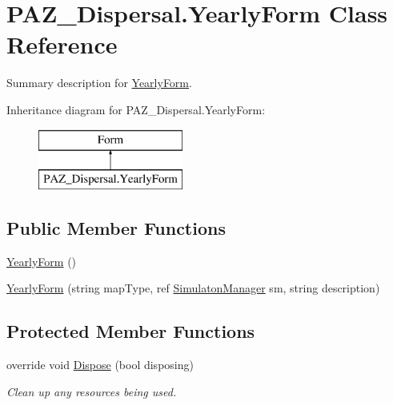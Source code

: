\hypertarget{class_p_a_z___dispersal_1_1_yearly_form}{\section{P\-A\-Z\-\_\-\-Dispersal.\-Yearly\-Form Class Reference}
\label{class_p_a_z___dispersal_1_1_yearly_form}
}


Summary description for \hyperlink{class_p_a_z___dispersal_1_1_yearly_form}{Yearly\-Form}.  


Inheritance diagram for P\-A\-Z\-\_\-\-Dispersal.\-Yearly\-Form\-:\begin{figure}[H]
\begin{center}
\leavevmode
\includegraphics[height=2.000000cm]{class_p_a_z___dispersal_1_1_yearly_form}
\end{center}
\end{figure}
\subsection*{Public Member Functions}
\begin{DoxyCompactItemize}
\item 
\hyperlink{class_p_a_z___dispersal_1_1_yearly_form_a5981ec773098b1dc4509d8584f6470f5}{Yearly\-Form} ()
\item 
\hyperlink{class_p_a_z___dispersal_1_1_yearly_form_a65d923a7c0699697a83c7dc4533b2ed7}{Yearly\-Form} (string map\-Type, ref \hyperlink{class_p_a_z___dispersal_1_1_simulaton_manager}{Simulaton\-Manager} sm, string description)
\end{DoxyCompactItemize}
\subsection*{Protected Member Functions}
\begin{DoxyCompactItemize}
\item 
override void \hyperlink{class_p_a_z___dispersal_1_1_yearly_form_a8aea90fe6d3ba5c15ddfeee2aea12ea0}{Dispose} (bool disposing)
\begin{DoxyCompactList}\small\item\em Clean up any resources being used. \end{DoxyCompactList}\end{DoxyCompactItemize}


